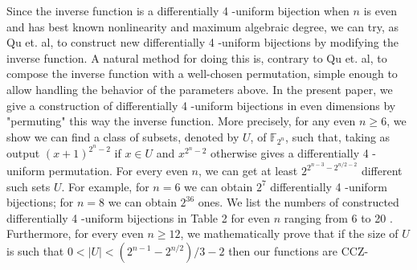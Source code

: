 \documentclass[10pt]{article}
\begin{document}
Since the inverse function is a differentially 4 -uniform bijection when $n$ is even and has best known nonlinearity and maximum algebraic degree, we can try, as Qu et. al, to construct new differentially 4 -uniform bijections by modifying the inverse function. A natural method for doing this is, contrary to Qu et. al, to compose the inverse function with a well-chosen permutation, simple enough to allow handling the behavior of the parameters above. In the present paper, we give a construction of differentially 4 -uniform bijections in even dimensions by "permuting" this way the inverse function. More precisely, for any even $n \geq 6$, we show we can find a class of subsets, denoted by $U$, of $\mathbb{F}_{2^{n}}$, such that, taking as output $(x+1)^{2^{n}-2}$ if $x \in U$ and $x^{2^{n}-2}$ otherwise gives a differentially 4 -uniform permutation. For every even $n$, we can get at least $2^{2^{n-3}-2^{n / 2-2}}$ different such sets $U$. For example, for $n=6$ we can obtain $2^{7}$ differentially 4 -uniform bijections; for $n=8$ we can obtain $2^{36}$ ones. We list the numbers of constructed differentially 4 -uniform bijections in Table 2 for even $n$ ranging from 6 to 20 . Furthermore, for every even $n \geq 12$, we mathematically prove that if the size of $U$ is such that $0<|U|<\left(2^{n-1}-2^{n / 2}\right) / 3-2$ then our functions are CCZ-\\
\end{document}
